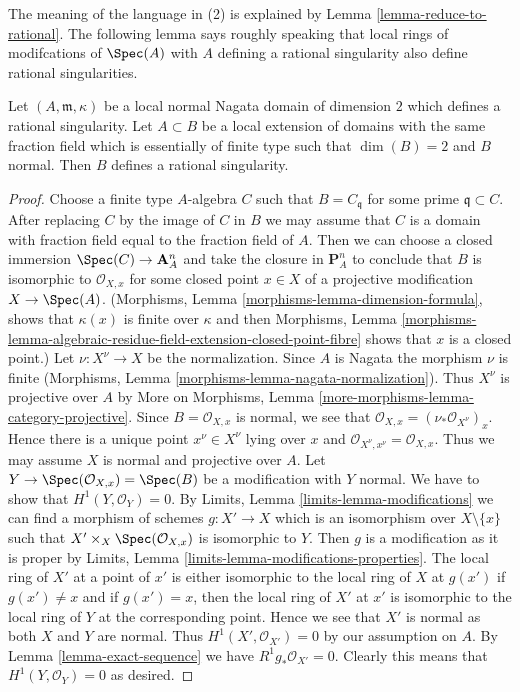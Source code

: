 \noindent
The meaning of the language in (2) is explained by
Lemma \ref{lemma-reduce-to-rational}. The following lemma
says roughly speaking that local rings of modifcations of $\Spec(A)$
with $A$ defining a rational singularity also define rational
singularities.

\begin{lemma}
\label{lemma-rational-propagates}
Let $(A, \mathfrak m, \kappa)$ be a local normal Nagata domain of
dimension $2$ which defines a rational singularity. Let $A \subset B$
be a local extension of domains with the same fraction field
which is essentially of finite type such
that $\dim(B) = 2$ and $B$ normal. Then $B$ defines a rational singularity.
\end{lemma}

\begin{proof}
Choose a finite type $A$-algebra $C$ such that $B = C_\mathfrak q$
for some prime $\mathfrak q \subset C$. After replacing
$C$ by the image of $C$ in $B$ we may assume that $C$ is a domain
with fraction field equal to the fraction field of $A$.
Then we can choose a closed immersion $\Spec(C) \to \mathbf{A}^n_A$
and take the closure in $\mathbf{P}^n_A$ to conclude that $B$
is isomorphic to $\mathcal{O}_{X, x}$ for some closed point $x \in X$
of a projective modification $X \to \Spec(A)$.
(Morphisms, Lemma \ref{morphisms-lemma-dimension-formula},
shows that $\kappa(x)$ is finite over $\kappa$ and then
Morphisms, Lemma
\ref{morphisms-lemma-algebraic-residue-field-extension-closed-point-fibre}
shows that $x$ is a closed point.)
Let $\nu : X^\nu \to X$ be the normalization.
Since $A$ is Nagata the morphism $\nu$ is finite (Morphisms, Lemma
\ref{morphisms-lemma-nagata-normalization}).
Thus $X^\nu$ is projective over $A$ by
More on Morphisms, Lemma
\ref{more-morphisms-lemma-category-projective}.
Since $B = \mathcal{O}_{X, x}$ is normal, we see that
$\mathcal{O}_{X, x} = (\nu_*\mathcal{O}_{X^\nu})_x$.
Hence there is a unique point $x^\nu \in X^\nu$ lying over $x$
and $\mathcal{O}_{X^\nu, x^\nu} = \mathcal{O}_{X, x}$.
Thus we may assume $X$ is normal and projective over $A$.
Let $Y \to \Spec(\mathcal{O}_{X, x}) = \Spec(B)$
be a modification with $Y$ normal.
We have to show that $H^1(Y, \mathcal{O}_Y) = 0$. By
Limits, Lemma \ref{limits-lemma-modifications}
we can find a morphism of schemes $g : X' \to X$ which is an isomorphism
over $X \setminus \{x\}$ such that $X' \times_X \Spec(\mathcal{O}_{X, x})$
is isomorphic to $Y$. Then $g$ is a modification as it is proper by
Limits, Lemma \ref{limits-lemma-modifications-properties}.
The local ring of $X'$ at a point of $x'$ is either isomorphic
to the local ring of $X$ at $g(x')$ if $g(x') \not = x$ and
if $g(x') = x$, then the local ring of $X'$ at $x'$ is isomorphic
to the local ring of $Y$ at the corresponding point. Hence we see
that $X'$ is normal as both $X$ and $Y$ are normal.
Thus $H^1(X', \mathcal{O}_{X'}) = 0$ by our assumption on $A$.
By Lemma \ref{lemma-exact-sequence} we have $R^1g_*\mathcal{O}_{X'} = 0$.
Clearly this means that $H^1(Y, \mathcal{O}_Y) = 0$ as desired.
\end{proof}

